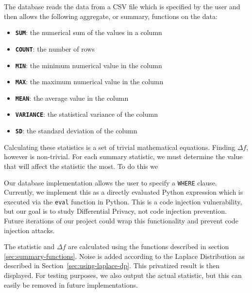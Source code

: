 \documentclass[conference,11pt]{IEEEtran}
\begin{document}
The database reads the data from a CSV file which is specified by the user and
then allows the following aggregate, or summary, functions on the data:
\begin{itemize}
    \item \textbf{\texttt{SUM}}: the numerical sum of the values in a column
    \item \textbf{\texttt{COUNT}}: the number of rows
    \item \textbf{\texttt{MIN}}: the minimum numerical value in the column
    \item \textbf{\texttt{MAX}}: the maximum numerical value in the column
    \item \textbf{\texttt{MEAN}}: the average value in the column
    \item \textbf{\texttt{VARIANCE}}: the statistical variance of the column
    \item \textbf{\texttt{SD}}: the standard deviation of the column
\end{itemize}

Calculating these statistics is a set of trivial mathematical equations.
Finding $\Delta f$, however is non-trivial. For each summary statistic, we must
determine the value that will affect the statistic the most. To do this we

Our database implementation allows the user to specify a \texttt{WHERE} clause.
Currently, we implement this as a directly evaluated Python expression which is
executed via the \texttt{eval} function in Python. This is a code injection
vulnerability, but our goal is to study Differential Privacy, not code injection
prevention. Future iterations of our project could wrap this functionality and
prevent code injection attacks.


The statistic and $\Delta f$ are calculated using the functions described in
section \ref{sec:summary-functions}. Noise is added according to the Laplace
Distribution as described in Section~\ref{sec:using-laplace-dp}. This privatized
result is then displayed. For testing purposes, we also output the actual
statistic, but this can easily be removed in future implementations.
\end{document}
